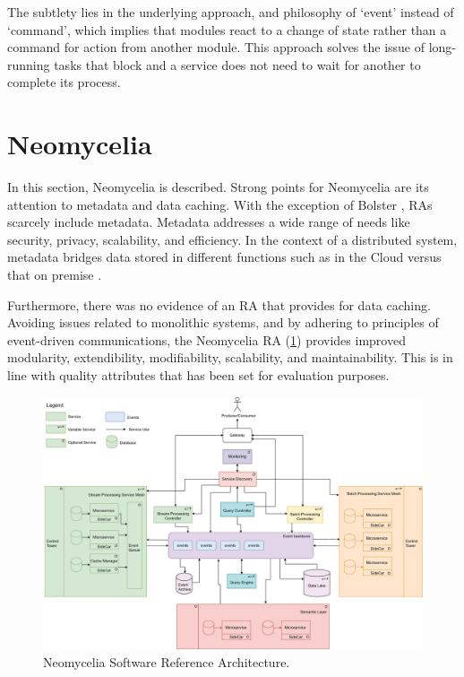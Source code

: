 \documentclass[conference]{IEEEtran}
\begin{document}
The subtlety lies in the underlying approach, and philosophy of ‘event’ instead of ‘command’, which implies that modules react to a change of state rather than a command for action from another module. This approach solves the issue of long-running tasks that block and a service does not need to wait for another to complete its process.


\section{Neomycelia}

In this section, Neomycelia is described. Strong points for Neomycelia are its attention to metadata and data caching. With the exception of Bolster \cite{Nadal}, RAs scarcely include metadata. Metadata addresses a wide range of needs like security, privacy, scalability, and efficiency. In the context of  a distributed system, metadata bridges data stored in different functions such as in the Cloud versus that on premise \cite{Eichler}.

Furthermore, there was no evidence of an RA that provides for data caching. Avoiding issues related to monolithic systems, and by adhering to principles of event-driven communications, the Neomycelia RA (\ref{NeomyceliaFig}) provides improved modularity, extendibility, modifiability, scalability, and maintainability. This is in line with quality attributes that has been set for evaluation purposes.

\begin{figure}[!ht]
    \centering
    \includegraphics[width=\textwidth]{Neomycelia.eps}
    \caption{Neomycelia Software Reference Architecture.} \label{NeomyceliaFig}
\end{figure}
\end{document}
